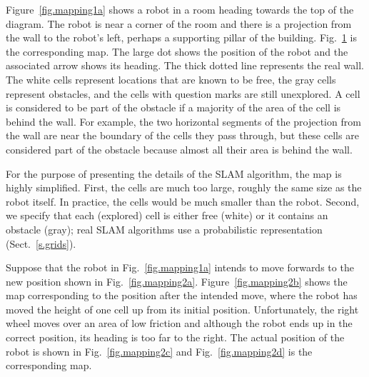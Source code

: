 Figure~\ref{fig.mapping1a} shows a robot in a room heading towards the top of the diagram. The robot is near a corner of the room and there is a projection from the wall to the robot's left, perhaps a supporting pillar of the building. Fig.~\ref{fig.mapping1b} is the corresponding map. The large dot shows the position of the robot and the associated arrow shows its heading. The thick dotted line represents the real wall. The white cells represent locations that are known to be free, the gray cells represent obstacles, and the cells with question marks are still unexplored. A cell is considered to be part of the obstacle if a majority of the area of the cell is behind the wall. For example, the two horizontal segments of the projection from the wall are near the boundary of the cells they pass through, but these cells are considered part of the obstacle because almost all their area is behind the wall.

\begin{figure}
\subfigures
\begin{minipage}{\textwidth}
\hspace{\fill}
\label{fig.mapping1a}
\label{fig.mapping1b}
\end{minipage}
\end{figure}

For the purpose of presenting the details of the SLAM algorithm, the map is highly simplified. First, the cells are much too large, roughly the same size as the robot itself. In practice, the cells would be much smaller than the robot. Second, we specify that each (explored) cell is either free (white) or it contains an obstacle (gray); real SLAM algorithms use a probabilistic representation (Sect.~\ref{s.grids}).

Suppose that the robot in Fig.~\ref{fig.mapping1a} intends to move forwards to the new position shown in Fig.~\ref{fig.mapping2a}. Figure~\ref{fig.mapping2b} shows the map corresponding to the position after the intended move, where the robot has moved the height of one cell up from its initial position. Unfortunately, the right wheel moves over an area of low friction and although the robot ends up in the correct position, its heading is too far to the right. The actual position of the robot is shown in  Fig.~\ref{fig.mapping2c} and Fig.~\ref{fig.mapping2d} is the corresponding map.


